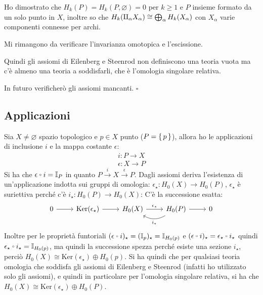 \documentclass[10pt, twoside=false, x11names]{scrbook}
\newenvironment{proof}{{\textbf{Dimostrazione}:}}{\hfill $\square$}
\renewcommand{\ker}[1]{\mathrm{Ker}( #1)}
\newcommand{\Id}[1][]{\mathbb{I}_#1}
\newcommand{\invamalg}{\mathbin{\text{\rotatebox[origin=c]{180}{$\Pi$}}}}
\let\latexcirc=\circ
\newcommand{\ccirc}{\mathbin{\mathchoice
  {\xcirc\scriptstyle}
  {\xcirc\scriptstyle}
  {\xcirc\scriptscriptstyle}
  {\xcirc\scriptscriptstyle}
}}
\newcommand{\xcirc}[1]{\vcenter{\hbox{$#1\latexcirc$}}}
\let\circ\ccirc
\let\emptyset\varnothing
\begin{document}
\begin{proof}
  Ho dimostrato che $ H_k(P) = H_k(P, \emptyset) = 0 $ per $ k \geq 1 $ e $ P $ insieme
  formato da un solo punto in $ X $,
  inoltre so che $ H_k (\invamalg_\alpha X_\alpha) \cong \bigoplus_\alpha H_k(X_\alpha) $ con $ X_\alpha $
  varie componenti connesse per archi.

  Mi rimangono da verificare l'invarianza omotopica e l'escissione.

  Quindi gli assiomi di Eilenberg e Steenrod non definiscono una teoria
  vuota ma c'è almeno una teoria a soddisfarli, che è l'omologia singolare
  relativa.

  In futuro verificherò gli assiomi mancanti.
\end{proof}
\subsection{Applicazioni}

Sia $ X \not = \emptyset $ spazio topologico e $ p \in X $ punto ($ P = \set{p} $), allora ho le
applicazioni di inclusione $ i $ e la mappa costante $ \epsilon $:
\begin{gather*}
  i \colon P \to X \\
  \epsilon \colon X \to P
\end{gather*}
Si ha che $ \epsilon \circ i = \Id{P} $ in quanto $ P \overset{i}{\to} X \overset{\epsilon}{\to} P $.
Dagli assiomi deriva l'esistenza di un'applicazione indotta
sui gruppi di omologia: $ \epsilon_\star \colon H_0(X) \to H_0(P) $,
$ \epsilon_\star $ è suriettiva perché c'è $ i_\star \colon H_0(P) \to H_0(X) $:
C'è la successione esatta:
\[
  \begin{tikzcd}
    0 \arrow{r}{} & \ker{\epsilon_\star} \arrow{r}{} & H_0(X) \arrow{r}{\epsilon_\star} & \arrow[bend left]{l}{i_\star} H_0(P) \arrow{r}{} & 0
  \end{tikzcd}
\]
Inoltre per le proprietà funtoriali $ (\epsilon \circ i)_\star = (\Id{p})_\star = \Id{H_0(p)} $
e $ (\epsilon \circ i)_\star = \epsilon_\star \circ i_\star $ quindi $ \epsilon_\star \circ i_\star = \Id{H_0(p)} $, ma quindi
la successione spezza perché esiste una sezione $ i_\star $, perciò $ H_0(X) \cong \ker{\epsilon_\star} \oplus H_0(p) $.
Si ha quindi che per qualsiasi teoria omologia che soddisfa gli assiomi di Eilenberg
e Steenrod (infatti ho utilizzato solo gli assiomi),
e quindi in particolare per l'omologia singolare relativa,
si ha che $ H_0(X) \cong \ker{\epsilon_\star} \oplus H_0(P) $.
\end{document}
